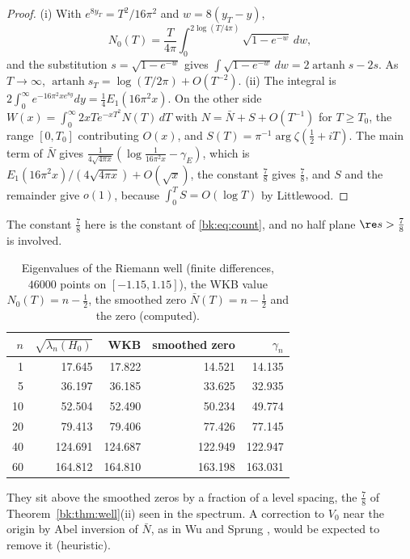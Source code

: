 \begin{proof}
\textup{(i)} With $e^{8y_T}=T^2/16\pi^2$ and $w=8(y_T-y)$,
\[N_0(T)=\frac{T}{4\pi}\int_0^{2\log(T/4\pi)}\sqrt{1-e^{-w}}\,dw,\]
and the substitution $s=\sqrt{1-e^{-w}}$ gives $\int\sqrt{1-e^{-w}}\,dw=2\operatorname{artanh}s-2s$. As $T\to\infty$, $\operatorname{artanh}s_T=\log(T/2\pi)+O(T^{-2})$. \textup{(ii)} The integral is $2\int_0^\infty e^{-16\pi^2xe^{8y}}dy=\frac14E_1(16\pi^2x)$. On the other side $W(x)=\int_0^\infty2xTe^{-xT^2}N(T)\,dT$ with $N=\bar N+S+O(T^{-1})$ for $T\ge T_0$, the range $[0,T_0]$ contributing $O(x)$, and $S(T)=\pi^{-1}\arg\zeta(\frac12+iT)$. The main term of $\bar N$ gives $\frac1{4\sqrt{4\pi x}}(\log\frac1{16\pi^2x}-\gamma_E)$, which is $E_1(16\pi^2x)/(4\sqrt{4\pi x})+O(\sqrt x)$, the constant $\frac78$ gives $\frac78$, and $S$ and the remainder give $o(1)$, because $\int_0^TS=O(\log T)$ by Littlewood.
\end{proof}

The constant $\frac78$ here is the constant of \eqref{bk:eq:count}, and no half plane $\re s>\frac78$ is involved.

\begin{table}[ht]
\centering
\small
\begin{tabular}{rrrrr}
\toprule
$n$ & $\sqrt{\lambda_n(H_0)}$ & WKB & smoothed zero & $\gamma_n$\\
\midrule
1 & 17.645 & 17.822 & 14.521 & 14.135\\
5 & 36.197 & 36.185 & 33.625 & 32.935\\
10 & 52.504 & 52.490 & 50.234 & 49.774\\
20 & 79.413 & 79.406 & 77.426 & 77.145\\
40 & 124.691 & 124.687 & 122.949 & 122.947\\
60 & 164.812 & 164.810 & 163.198 & 163.031\\
\bottomrule
\end{tabular}
\caption{Eigenvalues of the Riemann well (finite differences, $46000$ points on $[-1.15,1.15]$), the WKB value $N_0(T)=n-\frac12$, the smoothed zero $\bar N(T)=n-\frac12$ and the zero (computed).}\label{bk:tab:well}
\end{table}

They sit above the smoothed zeros by a fraction of a level spacing, the $\frac78$ of Theorem~\ref{bk:thm:well}\textup{(ii)} seen in the spectrum. A correction to $V_0$ near the origin by Abel inversion of $\bar N$, as in Wu and Sprung \cite{NCKolWuSprung93}, would be expected to remove it (heuristic).

